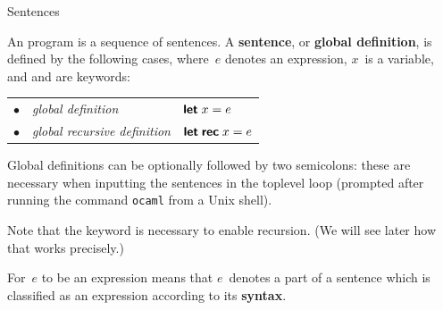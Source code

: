 %
\begin{frame}{Sentences}

  An \OCaml program is a sequence of sentences. A \textbf{sentence},
  or \textbf{global definition}, is defined by the following cases,
  where~\(e\) denotes an expression, \(x\)~is a variable, and \Xlet
  and \Xrec are keywords:

  \medskip

  \begin{tabular}{rll}
    $\bullet$ & \emph{global definition}
    & $\textsf{\textbf{let}} \; x = e$\\
    $\bullet$ & \emph{global recursive definition}
    & $\textsf{\textbf{let}} \; \textsf{\textbf{rec}} \; x = e$
  \end{tabular}

  \medskip

  Global definitions can be optionally followed by two semicolons:
  these are necessary when inputting the sentences in the toplevel
  loop (prompted after running the command \texttt{\small ocaml} from
  a Unix shell).

  \bigskip

  Note that the keyword \Xrec is necessary to enable recursion. (We
  will see later how that works precisely.)

  \bigskip

  For~\(e\) to be an expression means that \(e\)~denotes a part of a
  sentence which is classified as an expression according to its
  \textbf{syntax}.

\end{frame}

